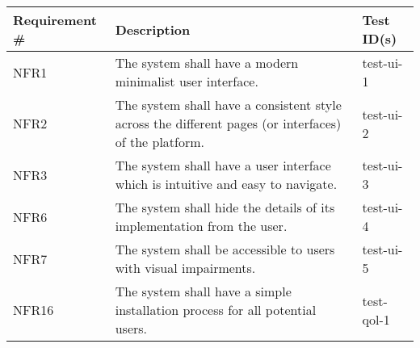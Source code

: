\documentclass[12pt, titlepage]{article}
\begin{document}
   \begin{table}[!hbp]
	
	\begin{tabular}{|p{3.5cm}|p{6.5cm}|p{4.5cm}|}

	\hline
	\textbf{Requirement \#} & \textbf{Description}                                                                                                                                                                  & \textbf{Test ID(s)}                                                                                          \\ \hline
	NFR1                     & The system shall have a modern minimalist user interface.                                                                                    & test-ui-1                                                                                                 \\ \hline
	NFR2                     & The system shall have a consistent style across the different pages (or interfaces) of the platform.                                                                             & test-ui-2                                                                                                 \\ \hline
	NFR3                     & The system shall have a user interface which is intuitive and easy to navigate.                                                                                                 & test-ui-3                                                                                         \\ \hline
	NFR6                     & The system shall hide the details of its implementation from the user. & test-ui-4                                                                                           \\ \hline
	NFR7                     & The system shall be accessible to users with visual impairments.                                                                                                        & test-ui-5                                                                                            \\ \hline
	NFR16                     & The system shall have a simple installation process for all potential users.                                                                                                                                 & test-qol-1                                                                                          \\ \hline

\end{tabular}
\end{table}
\end{document}
